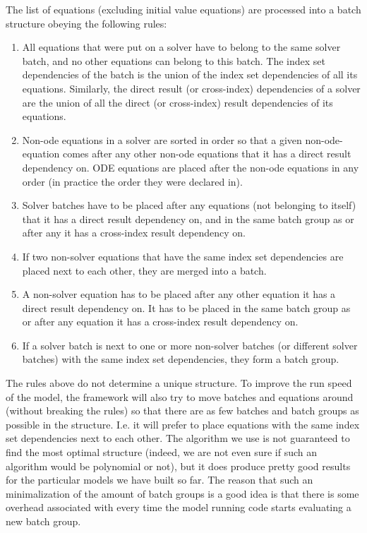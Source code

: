 \documentclass[11pt]{article}
\theoremstyle{definition}
\begin{document}
The list of equations (excluding initial value equations) are processed into a batch structure obeying the following rules:
\begin{enumerate}[i]
\item All equations that were put on a solver have to belong to the same solver batch, and no other equations can belong to this batch. The index set dependencies of the batch is the union of the index set dependencies of all its equations. Similarly, the direct result (or cross-index) dependencies of a solver are the union of all the direct (or cross-index) result dependencies of its equations.
\item Non-ode equations in a solver are sorted in order so that a given non-ode-equation comes after any other non-ode equations that it has a direct result dependency on. ODE equations are placed after the non-ode equations in any order (in practice the order they were declared in).
\item Solver batches have to be placed after any equations (not belonging to itself) that it has a direct result dependency on, and in the same batch group as or after any it has a cross-index result dependency on.
\item If two non-solver equations that have the same index set dependencies are placed next to each other, they are merged into a batch.
\item A non-solver equation has to be placed after any other equation it has a direct result dependency on. It has to be placed in the same batch group as or after any equation it has a cross-index result dependency on.
\item If a solver batch is next to one or more non-solver batches (or different solver batches) with the same index set dependencies, they form a batch group.
\end{enumerate}

The rules above do not determine a unique structure. To improve the run speed of the model, the framework will also try to move batches and equations around (without breaking the rules) so that there are as few batches and batch groups as possible in the structure. I.e. it will prefer to place equations with the same index set dependencies next to each other. The algorithm we use is not guaranteed to find the most optimal structure (indeed, we are not even sure if such an algorithm would be polynomial or not), but it does produce pretty good results for the particular models we have built so far. The reason that such an minimalization of the amount of batch groups is a good idea is that there is some overhead associated with every time the model running code starts evaluating a new batch group.
\end{document}
